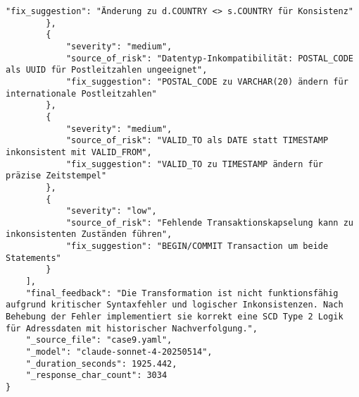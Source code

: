 \begin{lstlisting}[caption={Ausgabe: Claude Sonnet 4 Anwendungsfall 9 Konsistenzdurchlauf},label={claude_case9_prompt2}]
            "fix_suggestion": "Änderung zu d.COUNTRY <> s.COUNTRY für Konsistenz"
        },
        {
            "severity": "medium",
            "source_of_risk": "Datentyp-Inkompatibilität: POSTAL_CODE als UUID für Postleitzahlen ungeeignet",
            "fix_suggestion": "POSTAL_CODE zu VARCHAR(20) ändern für internationale Postleitzahlen"
        },
        {
            "severity": "medium",
            "source_of_risk": "VALID_TO als DATE statt TIMESTAMP inkonsistent mit VALID_FROM",
            "fix_suggestion": "VALID_TO zu TIMESTAMP ändern für präzise Zeitstempel"
        },
        {
            "severity": "low",
            "source_of_risk": "Fehlende Transaktionskapselung kann zu inkonsistenten Zuständen führen",
            "fix_suggestion": "BEGIN/COMMIT Transaction um beide Statements"
        }
    ],
    "final_feedback": "Die Transformation ist nicht funktionsfähig aufgrund kritischer Syntaxfehler und logischer Inkonsistenzen. Nach Behebung der Fehler implementiert sie korrekt eine SCD Type 2 Logik für Adressdaten mit historischer Nachverfolgung.",
    "_source_file": "case9.yaml",
    "_model": "claude-sonnet-4-20250514",
    "_duration_seconds": 1925.442,
    "_response_char_count": 3034
}
\end{lstlisting}

